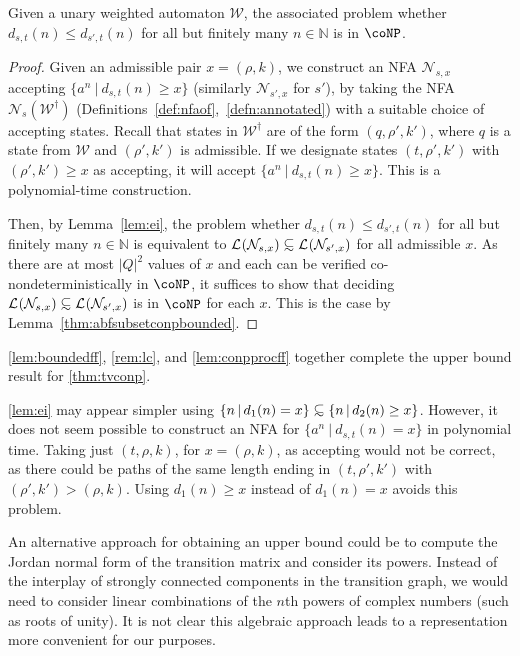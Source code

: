 \documentclass{lmcs}
\theoremstyle{plain}
\theoremstyle{definition}
\theoremstyle{remark}
\newcommand\lng[2]{\mathcal{L}_{#1}(#2)}
\newcommand\waannotated{\wa^\dagger}
\newcommand\dgf{d}
\newcommand\nfa{\mathcal{N}}
\newcommand\wa{\mathcal{W}}
\newcommand\nfaof[2]{\nfa_{#2}(#1)}
\newcommand\abfsubset{\mathrel{{\ooalign{\hss\raisebox{-0.6ex}{\small$\sim$}\hss\cr\raisebox{0.4ex}{$\subset$}}}}
}
\begin{document}
\begin{lem} \label{lem:conpprocff}
Given a unary weighted automaton $\wa$, the associated problem whether $\dgf_{s,t}(n) \le \dgf_{s',t}(n)$ for all but finitely many $n \in \mathbb{N}$ is in $\coNP$.
\end{lem}
\begin{proof}
Given an admissible pair $x=(\rho,k)$, we construct an NFA $\nfa_{s,x}$ accepting $\{a^n \ | \ \dgf_{s,t}(n) \ge x\}$ (similarly $\nfa_{s',x}$ for $s'$), by taking the NFA $\nfaof{\waannotated}{s}$ (Definitions~\ref{def:nfaof},~\ref{defn:annotated}) with a suitable choice of accepting states.
Recall that states in $\waannotated$ are of the form $(q,\rho',k')$, where $q$ is a state from $\wa$ and $(\rho',k')$ is admissible.
If we designate states $(t,\rho',k')$ with $(\rho',k')\ge x$ as accepting, it will accept  $\{a^n \ | \ \dgf_{s,t}(n) \ge x\}$.
This is a polynomial-time construction.

Then, by Lemma~\ref{lem:ei}, the problem whether $\dgf_{s,t}(n) \le \dgf_{s',t}(n)$ for all but finitely many $n \in \mathbb{N}$
is equivalent to $\lng{}{\nfa_{s,x}}\abfsubset \lng{}{\nfa_{s',x}}$ for all admissible $x$.
As there are at most $|Q|^2$ values of $x$ and each can be verified co-nondeterministically in $\coNP$, it suffices to show that deciding $\lng{}{\nfa_{s,x}}\abfsubset \lng{}{\nfa_{s',x}}$ is in $\coNP$ for each $x$.
This is the case by  Lemma~\ref{thm:abfsubsetconpbounded}.
\end{proof}

\cref{lem:boundedff}, \cref{rem:lc}, and \cref{lem:conpprocff} together complete the  upper bound result for \cref{thm:tvconp}.

\begin{rem}
\cref{lem:ei} may appear simpler using $\{ n\,|\, \dgf_1(n) = x\} \abfsubset \{ n\,|\, \dgf_2(n) \ge x\}$.
However, it does not seem possible to construct an NFA
for $\{a^n \ | \ \dgf_{s,t}(n) = x\}$ in polynomial time.  Taking just $(t,\rho,k)$, for $x = (\rho,k)$, as accepting
would not be correct, as there could be paths of the same length ending in $(t,\rho',k')$ with $(\rho',k')>(\rho,k)$.
Using $\dgf_1(n) \ge x$ instead of $\dgf_1(n) = x$ avoids this problem.
\end{rem}

\begin{rem}An alternative approach for obtaining an upper bound could be to compute the Jordan normal form of the transition matrix and consider
its powers. Instead of the interplay of strongly connected components
in the transition graph, we would need to consider linear combinations of
the $n$th powers of complex numbers (such as roots of unity).
It is not clear this algebraic approach leads to
a  representation more convenient for our purposes.
\end{rem}
\end{document}
